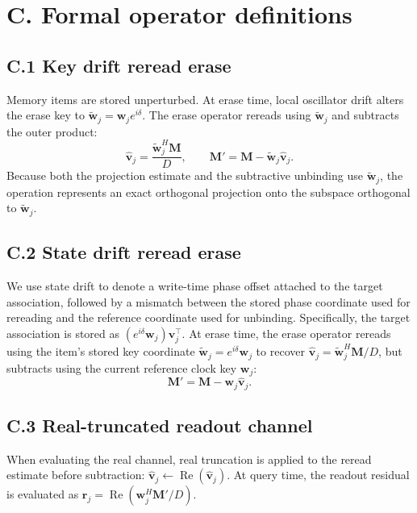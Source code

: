 \documentclass[11pt,a4paper]{article}
\newcommand{\M}{\mathbf{M}}
\begin{document}
\section{C. Formal operator definitions}\label{sec:C}

\subsection{C.1 Key drift reread erase}
Memory items are stored unperturbed. At erase time, local oscillator drift alters the erase key to $\tilde{\mathbf{w}}_j = \mathbf{w}_j e^{i\delta}$. The erase operator rereads using $\tilde{\mathbf{w}}_j$ and subtracts the outer product:
\begin{equation}
\hat{\mathbf{v}}_j = \frac{\tilde{\mathbf{w}}_j^H \M}{D}, \qquad \M' = \M - \tilde{\mathbf{w}}_j \hat{\mathbf{v}}_j.
\end{equation}
Because both the projection estimate and the subtractive unbinding use $\tilde{\mathbf{w}}_j$, the operation represents an exact orthogonal projection onto the subspace orthogonal to $\tilde{\mathbf{w}}_j$.

\subsection{C.2 State drift reread erase}
We use state drift to denote a write-time phase offset attached to the target association, followed by a mismatch between the stored phase coordinate used for rereading and the reference coordinate used for unbinding. Specifically, the target association is stored as $(e^{i\delta} \mathbf{w}_j) \mathbf{v}_j^\top$. At erase time, the erase operator rereads using the item's stored key coordinate $\tilde{\mathbf{w}}_j = e^{i\delta}\mathbf{w}_j$ to recover $\hat{\mathbf{v}}_j = \tilde{\mathbf{w}}_j^H \M / D$, but subtracts using the current reference clock key $\mathbf{w}_j$:
\begin{equation}
\M' = \M - \mathbf{w}_j \hat{\mathbf{v}}_j.
\end{equation}

\subsection{C.3 Real-truncated readout channel}
When evaluating the real channel, real truncation is applied to the reread estimate before subtraction: $\hat{\mathbf{v}}_j \leftarrow \operatorname{Re}(\hat{\mathbf{v}}_j)$. At query time, the readout residual is evaluated as $\mathbf{r}_j = \operatorname{Re}(\mathbf{w}_j^H \M' / D)$.
\end{document}
